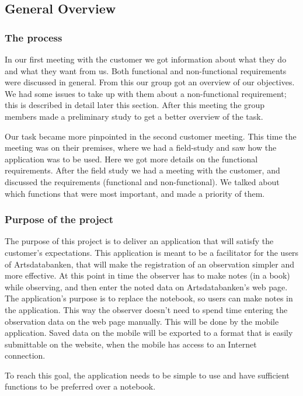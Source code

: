 \subsection{General Overview}

\subsubsection{ The process}
In our first meeting with the customer we got information about what they do and what they want from us. 
Both functional and non-functional requirements were discussed in general. 
From this our group got an overview of our objectives. 
We had some issues to take up with them about a non-functional requirement; this is described in detail later this section.
After this meeting the group members made a preliminary study to get a better overview of the task.

Our task became more pinpointed in the second customer meeting. 
This time the meeting was on their premises, where we had a field-study and saw how the 
application was to be used. Here we got more details on the functional requirements. 
After the field study we had a meeting with the customer, and discussed the requirements
(functional and non-functional). We talked about which functions that were most important, 
and made a priority of them.

\subsubsection{Purpose of the project}

The purpose of this project is to deliver an application that will satisfy the customer's expectations.
This application is meant to be a facilitator for the users of Artsdatabanken, 
that will make the registration of an observation simpler and more effective. 
At this point in time the observer has to make notes (in a book) while observing, 
and then enter the noted data on Artsdatabanken's web page. 
The application's purpose is to replace the notebook, so users can make notes in the application. 
This way the observer doesn't need to spend time entering the observation data on the web page manually. 
This will be done by the mobile application. Saved data on the mobile will be exported to a format 
that is easily submittable on the website, when the mobile has access to an Internet connection.

To reach this goal, the application needs to be simple to use and have sufficient functions to be preferred over a notebook. 



